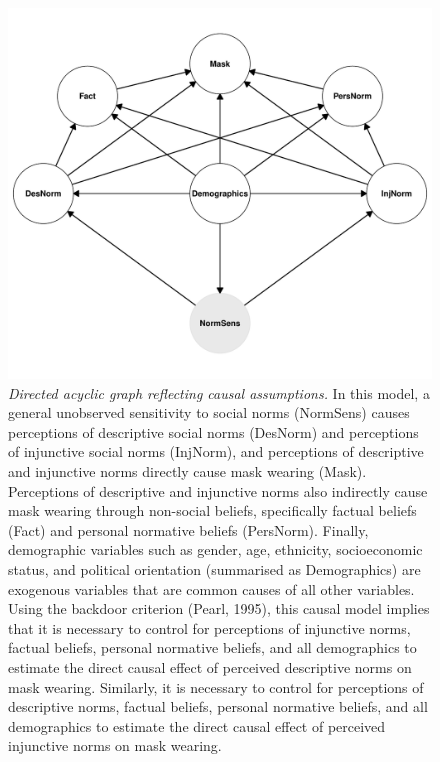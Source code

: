 \documentclass[
  man, donotrepeattitle,floatsintext]{apa6}
\begin{document}
\newpage



\begin{figure}
\centering
\includegraphics{manuscript_files/figure-latex/plotDAG-1.pdf}
\caption{\label{fig:plotDAG}\emph{Directed acyclic graph reflecting causal assumptions.} In this model, a general unobserved sensitivity to social norms (NormSens) causes perceptions of descriptive social norms (DesNorm) and perceptions of injunctive social norms (InjNorm), and perceptions of descriptive and injunctive norms directly cause mask wearing (Mask). Perceptions of descriptive and injunctive norms also indirectly cause mask wearing through non-social beliefs, specifically factual beliefs (Fact) and personal normative beliefs (PersNorm). Finally, demographic variables such as gender, age, ethnicity, socioeconomic status, and political orientation (summarised as Demographics) are exogenous variables that are common causes of all other variables. Using the backdoor criterion (Pearl, 1995), this causal model implies that it is necessary to control for perceptions of injunctive norms, factual beliefs, personal normative beliefs, and all demographics to estimate the direct causal effect of perceived descriptive norms on mask wearing. Similarly, it is necessary to control for perceptions of descriptive norms, factual beliefs, personal normative beliefs, and all demographics to estimate the direct causal effect of perceived injunctive norms on mask wearing.}
\end{figure}
\end{document}
